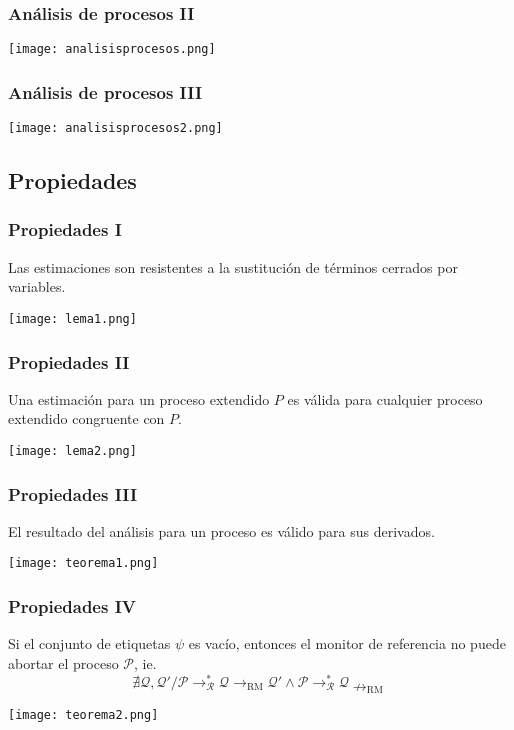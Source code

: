 \documentclass{beamer}
\begin{document}
\begin{frame}
    \frametitle{Análisis de procesos II}
    \pause
    \begin{center}
        \texttt{[image: analisisprocesos.png]}
    \end{center}
\end{frame}

\begin{frame}
    \frametitle{Análisis de procesos III}
    \pause
    \begin{center}
        \texttt{[image: analisisprocesos2.png]}
    \end{center}
\end{frame}

\subsection{Propiedades}

\begin{frame}
    \frametitle{Propiedades I}
    \pause
    Las estimaciones son resistentes a la sustitución de términos cerrados por variables.
    \pause[3]
    \begin{center}
        \texttt{[image: lema1.png]}
    \end{center}
\end{frame}

\begin{frame}
    \frametitle{Propiedades II}
    \pause
    Una estimación para un proceso extendido
    $P$ es válida para cualquier proceso extendido congruente con $P$.
    \pause[3]
    \begin{center}
        \texttt{[image: lema2.png]}
    \end{center}
\end{frame}

\begin{frame}
    \frametitle{Propiedades III}
    \pause
    El resultado del análisis para un proceso es válido para sus derivados.
    \pause[3]
    \begin{center}
        \texttt{[image: teorema1.png]}
    \end{center}
\end{frame}

\begin{frame}
    \frametitle{Propiedades IV}
    \pause
       Si el conjunto de etiquetas 
        $\psi$ es vacío, entonces el monitor de referencia no puede abortar el proceso $\mathcal{P}$, ie. $$\nexists \mathcal{Q, Q'} / \mathcal{P} \rightarrow^*_{\mathcal{R}} \mathcal{Q} \rightarrow_{\text{RM}} \mathcal{Q'} \wedge \mathcal{P} \rightarrow^*_{\mathcal{R}} \mathcal{Q} \nrightarrow_{\text{RM}}$$
    \pause[3]
    \begin{center}
        \texttt{[image: teorema2.png]}
    \end{center}
\end{frame}
\end{document}
